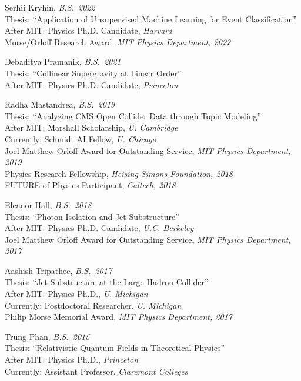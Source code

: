\bbl

\item Serhii Kryhin, \emph{B.S.~2022}
\\ Thesis: ``Application of Unsupervised Machine Learning for Event Classification''
\\ After MIT: Physics Ph.D. Candidate, \emph{Harvard}
\\ Morse/Orloff Research Award, \emph{MIT Physics Department, 2022}

\item Debaditya Pramanik, \emph{B.S.~2021}
\\ Thesis: ``Collinear Supergravity at Linear Order''
\\ After MIT: Physics Ph.D. Candidate, \emph{Princeton}

\item Radha Mastandrea, \emph{B.S.~2019}
\\ Thesis: ``Analyzing CMS Open Collider Data through Topic Modeling''
\\ After MIT: Marshall Scholarship, \emph{U. Cambridge}
\\ Currently: Schmidt AI Fellow, \emph{U. Chicago}
\\ Joel Matthew Orloff Award for Outstanding Service, \emph{MIT Physics Department, 2019}
\\ Physics Research Fellowship, \emph{Heising-Simons Foundation, 2018}
\\ FUTURE of Physics Participant, \emph{Caltech, 2018}

\item Eleanor Hall, \emph{B.S.~2018}
\\ Thesis: ``Photon Isolation and Jet Substructure''
\\ After MIT: Physics Ph.D. Candidate, \emph{U.C. Berkeley}
\\ Joel Matthew Orloff Award for Outstanding Service, \emph{MIT Physics Department, 2017}

\item Aashish Tripathee, \emph{B.S.~2017}
\\ Thesis: ``Jet Substructure at the Large Hadron Collider''
\\ After MIT: Physics Ph.D., \emph{U. Michigan}
\\ Currently: Postdoctoral Researcher, \emph{U. Michigan}
\\ Philip Morse Memorial Award, \emph{MIT Physics Department, 2017}

\item Trung Phan, \emph{B.S.~2015}
\\ Thesis: ``Relativistic Quantum Fields in Theoretical Physics''
\\ After MIT: Physics Ph.D., \emph{Princeton}
\\ Currently: Assistant Professor, \emph{Claremont Colleges}


